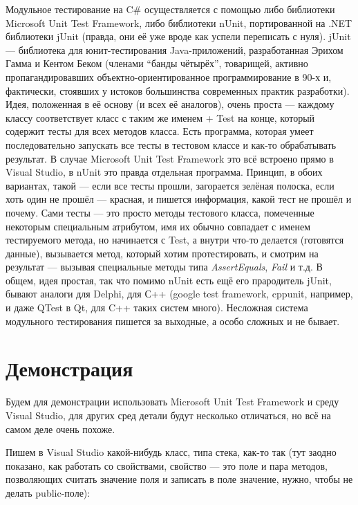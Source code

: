 \documentclass[a5paper]{article}
\begin{document}
Модульное тестирование на C\# осуществляется с помощью либо библиотеки Microsoft Unit Test Framework, либо библиотеки nUnit, портированной на .NET библиотеки jUnit (правда, они её уже вроде как успели переписать с нуля). jUnit --- библиотека для юнит-тестирования Java-приложений, разработанная Эрихом Гамма и Кентом Беком (членами ``банды чётырёх'', товарищей, активно пропагандировавших объектно-ориентированное программирование в 90-х и, фактически, стоявших у истоков большинства современных практик разработки). Идея, положенная в её основу (и всех её аналогов), очень проста --- каждому классу соответствует класс с таким же именем + Test на конце, который содержит тесты для всех методов класса. Есть программа, которая умеет последовательно запускать все тесты в тестовом классе и как-то обрабатывать результат. В случае Microsoft Unit Test Framework это всё встроено прямо в Visual Studio, в nUnit это правда отдельная программа. Принцип, в обоих вариантах, такой --- если все тесты прошли, загорается зелёная полоска, если хоть один не прошёл --- красная, и пишется информация, какой тест не прошёл и почему. Сами тесты --- это просто методы тестового класса, помеченные некоторым специальным атрибутом, имя их обычно совпадает с именем тестируемого метода, но начинается с Test, а внутри что-то делается (готовятся данные), вызывается метод, который хотим протестировать, и смотрим на результат --- вызывая специальные методы типа \textit{AssertEquals}, \textit{Fail} и т.д. В общем, идея простая, так что помимо nUnit есть ещё его прародитель jUnit, бывают аналоги для Delphi, для С++ (google test framework, cppunit, например, и даже QTest в Qt, для C++ таких систем много). Несложная система модульного тестирования пишется за выходные, а особо сложных и не бывает.

\section{Демонстрация}

Будем для демонстрации использовать Microsoft Unit Test Framework и среду Visual Studio, для других сред детали будут несколько отличаться, но всё на самом деле очень похоже.

Пишем в Visual Studio какой-нибудь класс, типа стека, как-то так (тут заодно показано, как работать со свойствами, свойство --- это поле и пара методов, позволяющих считать значение поля и записать в поле значение, нужно, чтобы не делать public-поле):
\end{document}
